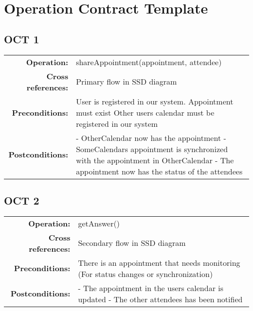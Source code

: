 \section{Operation Contract Template}
  \subsection{OCT 1}
    \begin{table*}[ht]\centering
      \begin{tabularx}{\textwidth}{@{}|rX|@{}}\hline
        \textbf{Operation:}        & shareAppointment(appointment, attendee) \\
        \textbf{Cross references:} & Primary flow in SSD diagram\\
        \textbf{Preconditions:}    & User is registered in our system.\newline
                                     Appointment must exist\newline
                                     Other users calendar must be registered in our system \\
        \textbf{Postconditions:}   & - OtherCalendar now has the appointment \newline
                                     - SomeCalendars appointment is synchronized with the appointment in OtherCalendar \newline
                                     - The appointment now has the status of the attendees \\\hline
      \end{tabularx}
    \end{table*}
  \subsection{OCT 2}
    \begin{table*}[ht]\centering
      \begin{tabularx}{\textwidth}{@{}|rX|@{}}\hline
        \textbf{Operation:}        & getAnswer()\\
        \textbf{Cross references:} & Secondary flow in SSD diagram \\
        \textbf{Preconditions:}    & There is an appointment that needs monitoring \newline
                                     (For status changes or synchronization)\\
        \textbf{Postconditions:}   & - The appointment in the users calendar is updated \newline 
                                     - The other attendees has been notified \\\hline
      \end{tabularx}
    \end{table*}
